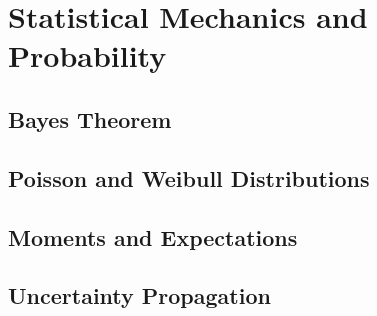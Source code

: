 \chapter{Statistical Mechanics and Probability}

\section{Bayes Theorem}


\section{Poisson and Weibull Distributions}
\TODO

\section{Moments and Expectations}
\TODO

\section{Uncertainty Propagation}
\TODO
